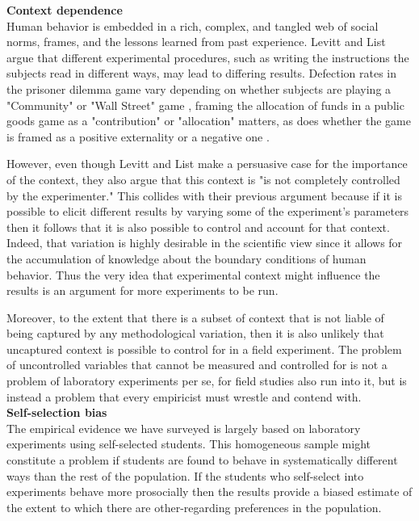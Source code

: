 \documentclass[12pt]{article}
\begin{document}
\textbf{Context dependence}
\\

Human behavior is embedded in a rich, complex, and tangled web of social norms, frames, and the lessons learned from past experience. Levitt and List argue that different experimental procedures, such as writing the instructions the subjects read in different ways, may lead to differing results. Defection rates in the prisoner dilemma game vary depending on whether subjects are playing a "Community" or "Wall Street" game \citep{ward1997naive}, framing the allocation of funds in a public goods game as a "contribution" or "allocation" matters, as does whether the game is framed as a positive externality or a negative one \citep{Andreoni1995}.

However, even though Levitt and List make a persuasive case for the importance of the context, they also argue that this context is "is not completely controlled by the experimenter." This collides with their previous argument because if it is possible to elicit different results by varying some of the experiment's parameters then it follows that it is also possible to control and account for that context. Indeed, that variation is highly desirable in the scientific view since it allows for the accumulation of knowledge about the boundary conditions of human behavior. Thus the very idea that experimental context might influence the results is an argument for more experiments to be run.

Moreover, to the extent that there is a subset of context that is not liable of being captured by any methodological variation, then it is also unlikely that uncaptured context is possible to control for in a field experiment. The problem of uncontrolled variables that cannot be measured and controlled for is not a problem of laboratory experiments per se, for field studies also run into it, but is instead a problem that every empiricist must wrestle and contend with. 
\\

\textbf{Self-selection bias}
\\

The empirical evidence we have surveyed is largely based on laboratory experiments using self-selected students. This homogeneous sample might constitute a problem if students are found to behave in systematically different ways than the rest of the population. If the students who self-select into experiments behave more prosocially then the results provide a biased estimate of the extent to which there are other-regarding preferences in the population.
\end{document}
